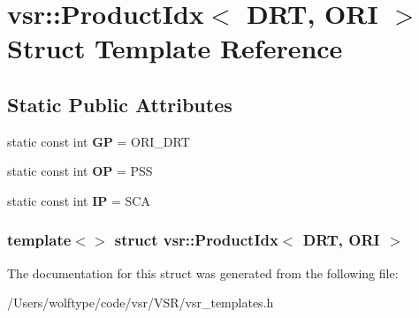 \hypertarget{structvsr_1_1_product_idx_3_01_d_r_t_00_01_o_r_i_01_4}{\section{vsr\-:\-:Product\-Idx$<$ D\-R\-T, O\-R\-I $>$ Struct Template Reference}
\label{structvsr_1_1_product_idx_3_01_d_r_t_00_01_o_r_i_01_4}
}
\subsection*{Static Public Attributes}
\begin{DoxyCompactItemize}
\item 
\hypertarget{structvsr_1_1_product_idx_3_01_d_r_t_00_01_o_r_i_01_4_a9844b760a85edd1337d2ad9ef09baa21}{static const int {\bfseries G\-P} = O\-R\-I\-\_\-\-D\-R\-T}\label{structvsr_1_1_product_idx_3_01_d_r_t_00_01_o_r_i_01_4_a9844b760a85edd1337d2ad9ef09baa21}

\item 
\hypertarget{structvsr_1_1_product_idx_3_01_d_r_t_00_01_o_r_i_01_4_a11ef93108d6e0bc8a7291742eeb0f125}{static const int {\bfseries O\-P} = P\-S\-S}\label{structvsr_1_1_product_idx_3_01_d_r_t_00_01_o_r_i_01_4_a11ef93108d6e0bc8a7291742eeb0f125}

\item 
\hypertarget{structvsr_1_1_product_idx_3_01_d_r_t_00_01_o_r_i_01_4_a25284fcf257b13fc5bf3d33a4209385b}{static const int {\bfseries I\-P} = S\-C\-A}\label{structvsr_1_1_product_idx_3_01_d_r_t_00_01_o_r_i_01_4_a25284fcf257b13fc5bf3d33a4209385b}

\end{DoxyCompactItemize}
\subsubsection*{template$<$$>$ struct vsr\-::\-Product\-Idx$<$ D\-R\-T, O\-R\-I $>$}



The documentation for this struct was generated from the following file\-:\begin{DoxyCompactItemize}
\item 
/\-Users/wolftype/code/vsr/\-V\-S\-R/vsr\-\_\-templates.\-h\end{DoxyCompactItemize}
